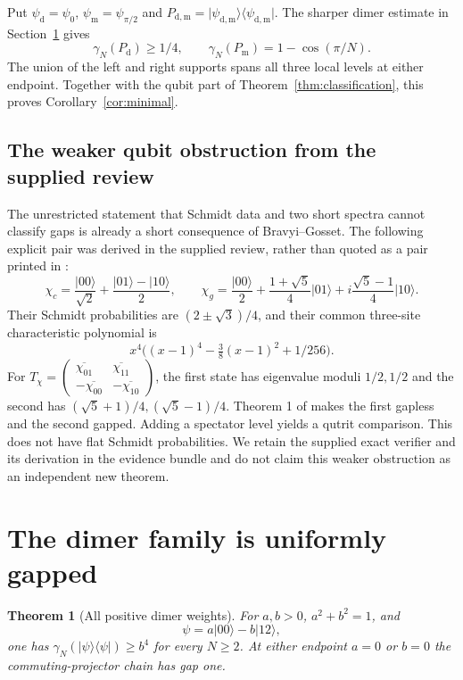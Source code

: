 \documentclass[11pt,a4paper]{article}
\newtheorem{theorem}{Theorem}[section]
\theoremstyle{remark}\newtheorem{remark}[theorem]{Remark}
\newcommand{\ket}[1]{\lvert #1\rangle}
\newcommand{\bra}[1]{\langle #1\rvert}
\begin{document}
Put $\psi_{\mathrm d}=\psi_0$, $\psi_{\mathrm m}=\psi_{\pi/2}$ and $P_{\mathrm d,\mathrm m}=\ket{\psi_{\mathrm d,\mathrm m}}\bra{\psi_{\mathrm d,\mathrm m}}$. The sharper dimer estimate in Section~\ref{sec:dimer} gives
\begin{equation}\label{eq:mainbounds}
 \gamma_N(P_{\mathrm d})\ge1/4,\qquad
 \gamma_N(P_{\mathrm m})=1-\cos(\pi/N).
\end{equation}
The union of the left and right supports spans all three local levels at either endpoint. Together with the qubit part of Theorem~\ref{thm:classification}, this proves Corollary~\ref{cor:minimal}.

\subsection{The weaker qubit obstruction from the supplied review}\label{sec:qubitcomparison}
The unrestricted statement that Schmidt data and two short spectra cannot classify gaps is already a short consequence of Bravyi--Gosset. The following explicit pair was derived in the supplied review, rather than quoted as a pair printed in \cite{BG}:
\[
 \chi_c=\frac{\ket{00}}{\sqrt2}+\frac{\ket{01}-\ket{10}}2,
 \qquad
 \chi_g=\frac{\ket{00}}2+\frac{1+\sqrt5}{4}\ket{01}
       +i\frac{\sqrt5-1}{4}\ket{10}.
\]
Their Schmidt probabilities are $(2\pm\sqrt3)/4$, and their common three-site characteristic polynomial is
\[
 x^4\bigl((x-1)^4-\tfrac38(x-1)^2+1/256\bigr).
\]
For $T_\chi=\left(\begin{smallmatrix}\overline{\chi_{01}}&\overline{\chi_{11}}\\-\overline{\chi_{00}}&-\overline{\chi_{10}}\end{smallmatrix}\right)$,
the first state has eigenvalue moduli $1/2,1/2$ and the second has $(\sqrt5+1)/4,(\sqrt5-1)/4$. Theorem 1 of \cite{BG} makes the first gapless and the second gapped. Adding a spectator level yields a qutrit comparison. This does not have flat Schmidt probabilities. We retain the supplied exact verifier and its derivation in the evidence bundle and do not claim this weaker obstruction as an independent new theorem.
\section{The dimer family is uniformly gapped}\label{sec:dimer}
\begin{theorem}[All positive dimer weights]\label{thm:dimer}
For $a,b>0$, $a^2+b^2=1$, and
\begin{equation}\label{eq:dimer-family}
 \psi=a\ket{00}-b\ket{12},
\end{equation}
one has $\gamma_N(\ket\psi\bra\psi)\ge b^4$ for every $N\ge2$.
At either endpoint $a=0$ or $b=0$ the commuting-projector chain has gap one.
\end{theorem}
\end{document}
